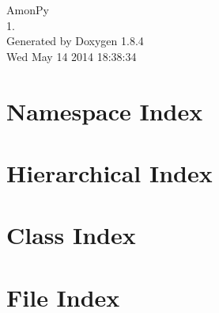 \documentclass[twoside]{book}
\newcommand{\clearemptydoublepage}{%
  \newpage{\pagestyle{empty}\cleardoublepage}%
}
\begin{document}
\hypersetup{pageanchor=false}
\begin{titlepage}
\vspace*{7cm}
\begin{center}%
{\Large Amon\-Py \\[1ex]\large 1. }\\
\vspace*{1cm}
{\large Generated by Doxygen 1.8.4}\\
\vspace*{0.5cm}
{\small Wed May 14 2014 18:38:34}\\
\end{center}
\end{titlepage}
\clearemptydoublepage
\tableofcontents
\clearemptydoublepage
{}
\hypersetup{pageanchor=true}

\chapter{Namespace Index}

\chapter{Hierarchical Index}

\chapter{Class Index}

\chapter{File Index}

\end{document}
